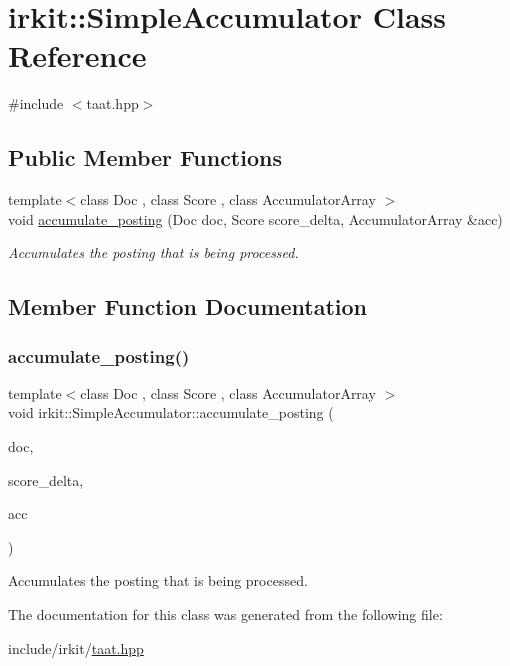 \hypertarget{classirkit_1_1SimpleAccumulator}{}\section{irkit\+:\+:Simple\+Accumulator Class Reference}
\label{classirkit_1_1SimpleAccumulator}


{\ttfamily \#include $<$taat.\+hpp$>$}

\subsection*{Public Member Functions}
\begin{DoxyCompactItemize}
\item 
{\footnotesize template$<$class Doc , class Score , class Accumulator\+Array $>$ }\\void \hyperlink{classirkit_1_1SimpleAccumulator_af747d80dbebe394e3ebe920afeeac810}{accumulate\+\_\+posting} (Doc doc, Score score\+\_\+delta, Accumulator\+Array \&acc)
\begin{DoxyCompactList}\small\item\em Accumulates the posting that is being processed. \end{DoxyCompactList}\end{DoxyCompactItemize}


\subsection{Member Function Documentation}
\mbox{\label{classirkit_1_1SimpleAccumulator_af747d80dbebe394e3ebe920afeeac810}} 
\subsubsection{\texorpdfstring{accumulate\+\_\+posting()}{accumulate\_posting()}}
{\footnotesize\ttfamily template$<$class Doc , class Score , class Accumulator\+Array $>$ \\
void irkit\+::\+Simple\+Accumulator\+::accumulate\+\_\+posting (\begin{DoxyParamCaption}\item[{Doc}]{doc,  }\item[{Score}]{score\+\_\+delta,  }\item[{Accumulator\+Array \&}]{acc }\end{DoxyParamCaption})\hspace{0.3cm}{\ttfamily [inline]}}



Accumulates the posting that is being processed. 



The documentation for this class was generated from the following file\+:\begin{DoxyCompactItemize}
\item 
include/irkit/\hyperlink{taat_8hpp}{taat.\+hpp}\end{DoxyCompactItemize}
